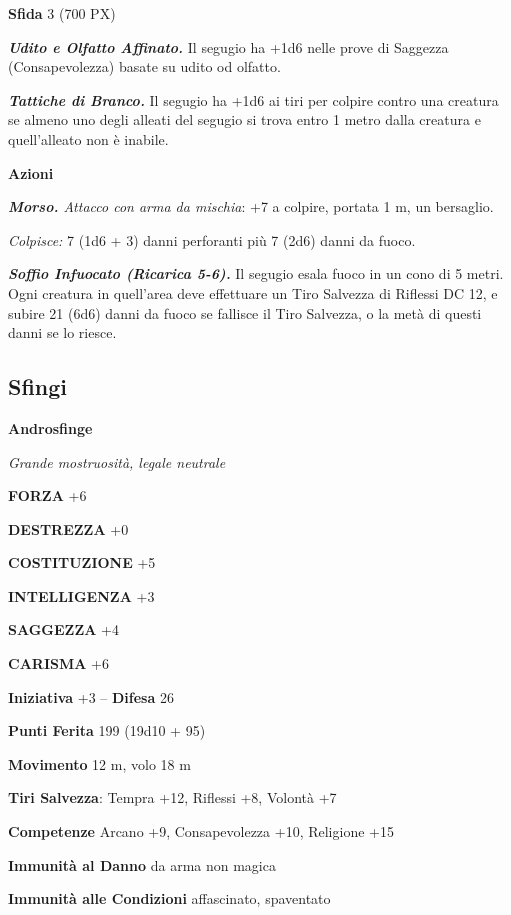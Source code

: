 \begin{multicols}{2}
	\textbf{Sfida} 3 (700 PX)

	\textit{\textbf{Udito e Olfatto Affinato.}} Il segugio ha +1d6 nelle prove di Saggezza (Consapevolezza) basate su udito od olfatto.

	\textit{\textbf{Tattiche di Branco.}} Il segugio ha +1d6 ai tiri per colpire contro una creatura se almeno uno degli alleati del segugio si trova entro 1 metro dalla creatura e quell'alleato non è inabile.

	\textbf{Azioni}

	\textit{\textbf{Morso.} Attacco con arma da mischia}: +7 a colpire, portata 1 m, un bersaglio.

	\textit{Colpisce:} 7 (1d6 + 3) danni perforanti più 7 (2d6) danni da fuoco.

	\textit{\textbf{Soffio Infuocato (Ricarica 5-6).}} Il segugio esala fuoco in un cono di 5 metri. Ogni creatura in quell'area deve effettuare un Tiro Salvezza di Riflessi DC 12, e subire 21 (6d6) danni da fuoco se fallisce il Tiro Salvezza, o la metà di questi danni se lo riesce.



	\subsection{Sfingi}

	\medskip{}\textbf{Androsfinge}

	\textit{Grande mostruosità, legale neutrale}

	\textbf{FORZA} +6

	\textbf{DESTREZZA} +0

	\textbf{COSTITUZIONE} +5

	\textbf{INTELLIGENZA} +3

	\textbf{SAGGEZZA} +4

	\textbf{CARISMA} +6

	\textbf{Iniziativa} +3 -- \textbf{Difesa} 26

	\textbf{Punti Ferita} 199 (19d10 + 95)

	\textbf{Movimento} 12 m, volo 18 m

	\textbf{Tiri Salvezza}: Tempra +12, Riflessi +8, Volontà +7

	\textbf{Competenze} Arcano +9, Consapevolezza +10, Religione +15

	\textbf{Immunità al Danno} da arma non magica

	\textbf{Immunità alle Condizioni} affascinato, spaventato


\end{multicols}
